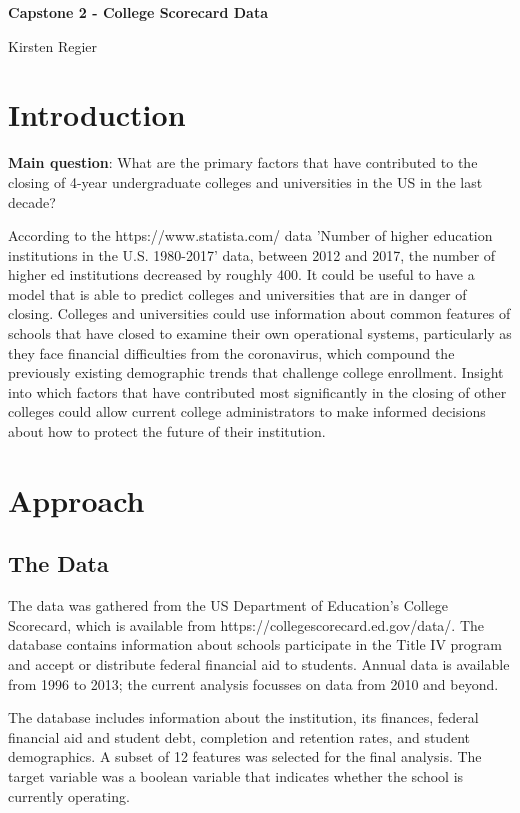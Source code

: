 \documentclass[11pt, letterpaper]{article}
\begin{document}
\begin{center}
\Large{\textbf{Capstone 2 - College Scorecard Data}}

\large{Kirsten Regier}
\end{center}

\section{Introduction}

\textbf{Main question}: What are the primary factors that have contributed to the closing of 4-year undergraduate colleges and universities in the US in the last decade?

According to the https://www.statista.com/ data 'Number of higher education institutions in the U.S. 1980-2017' data, between 2012 and 2017, the number of higher ed institutions decreased by roughly 400.  It could be useful to have a model that is able to predict colleges and universities that are in danger of closing. 
Colleges and universities could use information about common features of schools that have closed to examine their own operational systems, particularly as they face financial difficulties from the coronavirus, which compound the previously existing demographic trends that challenge college enrollment. Insight into which factors that have contributed most significantly in the closing of other colleges could allow current college administrators to make informed decisions about how to protect the future of their institution.

\section{Approach}
\subsection{The Data}
The data was gathered from the US Department of Education's College Scorecard, which is available from https://collegescorecard.ed.gov/data/. The database contains information about schools participate in the Title IV program and accept or distribute federal financial aid to students. Annual data is available from 1996 to 2013; the current analysis focusses on data from 2010 and beyond.

The database includes information about the institution, its finances, federal financial aid and student debt, completion and retention rates, and student demographics. A subset of 12 features was selected for the final analysis. The target variable was a boolean variable that indicates whether the school is currently operating.
\end{document}
